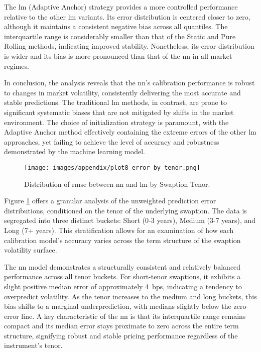 The \ac{lm} (Adaptive Anchor) strategy provides a more controlled performance relative to the other \ac{lm} variants. Its error distribution is centered closer to zero, although it maintains a consistent negative bias across all quantiles. The interquartile range is considerably smaller than that of the Static and Pure Rolling methods, indicating improved stability. Nonetheless, its error distribution is wider and its bias is more pronounced than that of the \ac{nn} in all market regimes.

In conclusion, the analysis reveals that the \ac{nn}'s calibration performance is robust to changes in market volatility, consistently delivering the most accurate and stable predictions. The traditional \ac{lm} methods, in contrast, are prone to significant systematic biases that are not mitigated by shifts in the market environment. The choice of initialization strategy is paramount, with the Adaptive Anchor method effectively containing the extreme errors of the other \ac{lm} approaches, yet failing to achieve the level of accuracy and robustness demonstrated by the machine learning model.

\begin{figure}[H]
	\centering
	\texttt{[image: images/appendix/plot8\_error\_by\_tenor.png]}
	\caption{Distribution of \ac{rmse} between \ac{nn} and \ac{lm} by Swaption Tenor.}
	\label{fig:distribution_rmse_by_swaption_tenor}
\end{figure}

Figure \ref{fig:distribution_rmse_by_swaption_tenor} offers a granular analysis of the unweighted prediction error distributions, conditioned on the tenor of the underlying swaption. The data is segregated into three distinct buckets: Short (0-3 years), Medium (3-7 years), and Long (7+ years). This stratification allows for an examination of how each calibration model's accuracy varies across the term structure of the swaption volatility surface.

The \ac{nn} model demonstrates a structurally consistent and relatively balanced performance across all tenor buckets. For short-tenor swaptions, it exhibits a slight positive median error of approximately 4~\ac{bps}, indicating a tendency to overpredict volatility. As the tenor increases to the medium and long buckets, this bias shifts to a marginal underprediction, with medians slightly below the zero-error line. A key characteristic of the \ac{nn} is that its interquartile range remains compact and its median error stays proximate to zero across the entire term structure, signifying robust and stable pricing performance regardless of the instrument's tenor.

